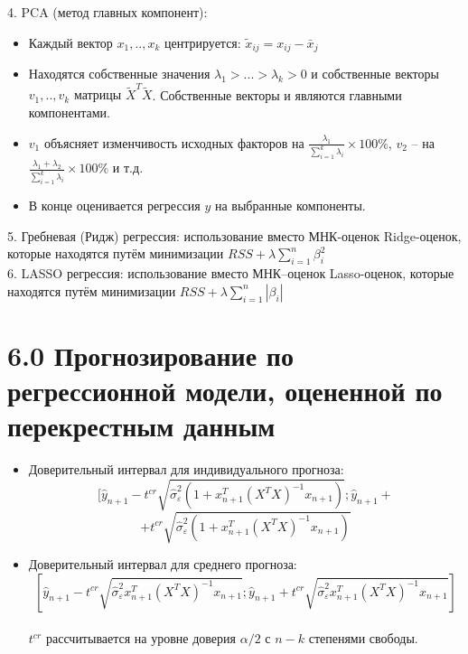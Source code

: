 \documentclass[a0,final]{a0poster}
\begin{document}
\begin{multicols}{4}
4. PCA (метод главных компонент):
\begin{itemize}
\item {Каждый вектор $x_1,..,x_k$ центрируется: $\tilde{x}_{ij}=x_{ij}-\bar{x}_{j}$}
\item {Находятся собственные значения $\lambda_1>...>\lambda_k>0$ и собственные векторы $v_1,..,v_k$ матрицы $\tilde{X}^T\tilde{X}$}. Собственные векторы и являются главными компонентами.
\item {$v_1$ объясняет изменчивость исходных факторов на $\frac{\lambda_1}{\sum\limits_{i=1}^{k}\lambda_i}\times 100\%$, $v_2$ -- на $\frac{\lambda_1+\lambda_2}{\sum\limits_{i=1}^{k}\lambda_i}\times 100\%$ и т.д.}
\item {В конце оценивается регрессия $y$ на выбранные компоненты.}
\end{itemize}
5. Гребневая (Ридж) регрессия: использование вместо МНК-оценок Ridge-оценок, которые находятся путём минимизации $RSS + \lambda\sum\limits_{i=1}^{n}\beta_i^2 $ \\
6. LASSO регрессия: использование вместо МНК--оценок Lasso-оценок, которые находятся путём минимизации $RSS + \lambda\sum\limits_{i=1}^{n}|\beta_i| $ \\

\section*{6.0 Прогнозирование по регрессионной модели, оцененной по перекрестным данным}
\begin{itemize}
\item{Доверительный интервал для индивидуального прогноза:}\\
\[[\hat{y}_{n+1} - t^{cr}\sqrt{\hat{\sigma}^2_\varepsilon(1+
x^T_{n+1}{(X^TX)}^{-1}x_{n+1})}; \hat{y}_{n+1} + \]
\[+ t^{cr}\sqrt{\hat{\sigma}^2_\varepsilon(1+
x^T_{n+1}{(X^TX)}^{-1}x_{n+1})} \]

\item{Доверительный интервал для среднего прогноза:}\\
\[[\hat{y}_{n+1} - t^{cr}\sqrt{\hat{\sigma}^2_\varepsilon x^T_{n+1}{(X^TX)}^{-1}x_{n+1}}; \hat{y}_{n+1} + t^{cr}\sqrt{\hat{\sigma}^2_\varepsilon x^T_{n+1}{(X^TX)}^{-1}x_{n+1}}] \]
\\
$t^{cr}$ рассчитывается на уровне доверия $\alpha/2$ с $n-k$ степенями свободы.
\end{itemize}
\onehalfspacing

\end{multicols}
\end{document}
